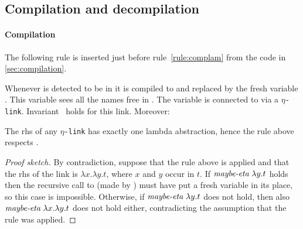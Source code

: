 \documentclass[sigconf,natbib=false,review]{acmart}
\newcommand{\appsep}{\ensuremath{\textcolor{lightgray}{\cdot}}}
\newcommand{\linkMacro}[1]{\ensuremath{#1}\texttt{-link}\xspace}
\newcommand{\linketa} {\linkMacro{\eta}}
\newcommand{\Ho}{\texorpdfstring{\ensuremath{\mathcal{H}}\xspace}{H}}
\newcommand{\rhs}{rhs\xspace}
\begin{document}

% 


\subsection{Compilation and decompilation}\label{sec:etacomp}


\paragraph{Compilation}
The following rule is inserted just before rule~\ref{rule:complam} from the code in
\cref{sec:compilation}.



\noindent
Whenever  is detected to be in
\maybeeta it is compiled to  and replaced by the fresh
variable . This variable sees all the names free in
. The variable is connected to  via a \linketa.
Invariant~ holds for this link. Moreover:

\begin{corollary}
  The \rhs of any \linketa has exactly one lambda abstraction, hence
  the rule above respects .
  \label{cor:rhs-eta-onelamb}
\end{corollary}

\begin{proof}[Proof sketch]
  By contradiction, suppose that the rule above is applied and that
  the \rhs of the link is $\lambda x.\lambda y.t$, where $x$ and $y$ occur in $t$.
  If $\emph{maybe-eta}{}~\lambda y.t$ holds then the recursive call to
   (made by ) must have put a fresh variable
  in its place, so this case is impossible.
  Otherwise, if $\emph{maybe-eta}{}~\lambda y.t$ does not hold, then also
  $\emph{maybe-eta}{}~\lambda x.\lambda y.t$ does not hold either, contradicting
  the assumption that the rule was applied.
\end{proof}
\end{document}
